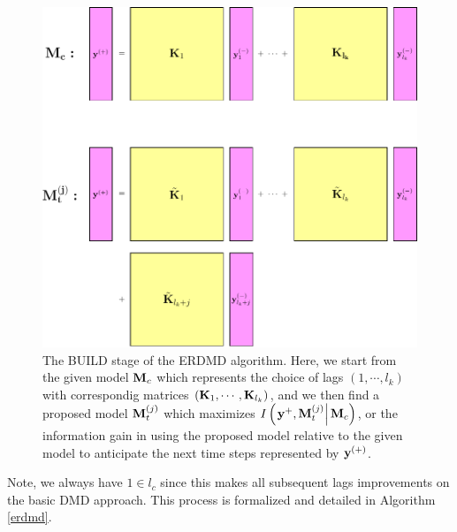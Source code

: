 \documentclass[a4paper,11pt]{article}
\begin{document}
\begin{figure}
\centering
\includegraphics[scale=.75]{square_games-pics}
\caption{The BUILD stage of the ERDMD algorithm.  Here, we start from the given model ${\bf M}_{c}$ which represents the choice of lags $(1, \cdots, l_{k})$ with correspondig matrices $({\bf K}_{1}, \cdots, {\bf K}_{l_{k}})$, and we then find a proposed model ${\bf M}^{(j)}_{t}$ which maximizes $I\left(\left.{\bf y}^{+}, {\bf M}^{(j)}_{t}\right|{\bf M}_{c}\right)$, or the information gain in using the proposed model relative to the given model to anticipate the next time steps represented by ${\bf y}^{(+)}$.}  
\label{fig:build_stage}
\end{figure}
Note, we always have $1\in l_{c}$ since this makes all subsequent lags improvements on the basic DMD approach.  This process is formalized and detailed in Algorithm \ref{erdmd}.  
\end{document}
